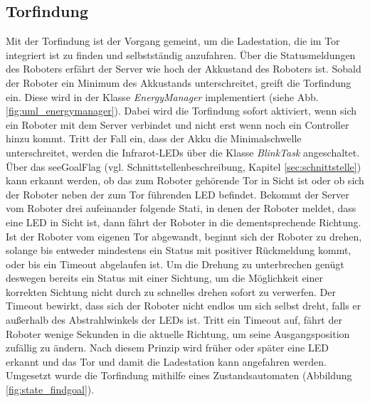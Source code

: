 \subsection{Torfindung}
\label{sec:torfindung}
Mit der Torfindung ist der Vorgang gemeint, um die Ladestation, die im Tor integriert ist zu finden und selbstständig anzufahren. Über die Statusmeldungen des Roboters erfährt der Server wie hoch der Akkustand des Roboters ist. Sobald der Roboter ein Minimum des Akkustands unterschreitet, greift die Torfindung ein. Diese wird in der Klasse \textit{EnergyManager} implementiert (siehe Abb. \ref{fig:uml_energymanager}). Dabei wird die Torfindung sofort aktiviert, wenn sich ein Roboter mit dem Server verbindet und nicht erst wenn noch ein Controller hinzu kommt. Tritt der Fall ein, dass der Akku die Minimalschwelle unterschreitet, werden die Infrarot-LEDs über die Klasse \textit{BlinkTask} angeschaltet. Über das \glqq seeGoal\grqq Flag (vgl. Schnittstellenbeschreibung, Kapitel \ref{sec:schnittstelle}) kann erkannt werden, ob das zum Roboter gehörende Tor in Sicht ist oder ob sich der Roboter neben der zum Tor führenden LED befindet. Bekommt der Server vom Roboter drei aufeinander folgende Stati, in denen der Roboter meldet, dass eine LED in Sicht ist, dann fährt der Roboter in die dementsprechende Richtung. Ist der Roboter vom eigenen Tor abgewandt, beginnt sich der Roboter zu drehen, solange bis entweder mindestens ein Status mit positiver Rückmeldung kommt, oder bis ein Timeout abgelaufen ist. Um die Drehung zu unterbrechen genügt deswegen bereits ein Status mit einer Sichtung, um die Möglichkeit einer korrekten Sichtung nicht durch zu schnelles drehen sofort zu verwerfen. Der Timeout bewirkt, dass sich der Roboter nicht endlos um sich selbst dreht, falls er außerhalb des Abstrahlwinkels der LEDs ist. Tritt ein Timeout auf, fährt der Roboter wenige Sekunden in die aktuelle Richtung, um seine Ausgangsposition zufällig zu ändern. Nach diesem Prinzip wird früher oder später eine LED erkannt und das Tor und damit die Ladestation kann angefahren werden. \\ Umgesetzt wurde die Torfindung mithilfe eines Zustandsautomaten (Abbildung \ref{fig:state_findgoal}).

